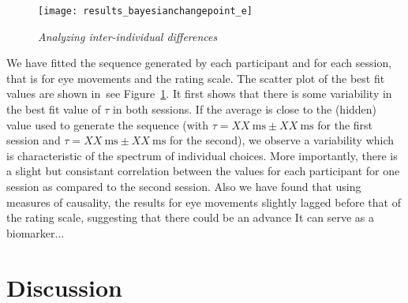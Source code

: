 \documentclass[profile,final,english, draft]{article}%
\newcommand{\ms}{\si{\milli\second}}%
\newcommand{\seeFig}[1]{see Figure~\ref{fig:#1}}
\begin{document}
\begin{figure}%
\begin{center}
    \texttt{[image: results\_bayesianchangepoint\_e]}
\end{center}
\caption{\emph{Analyzing inter-individual differences}
}
\label{fig:results_inter}
\end{figure}
We have fitted the sequence generated by each participant and
for each session, that is for eye movements and the rating scale.
The scatter plot of the best fit values are shown in~\seeFig{results_inter}.
It first shows that there is some variability in the best fit value of $\tau$
in both sessions.
If the average is close to the (hidden) value used to generate the sequence
(with $\tau = XX~\ms \pm XX~\ms$ for the first session and
 $\tau = XX~\ms \pm XX~\ms$ for the second),
 we observe a variability which is characteristic of the spectrum of individual choices.
More importantly, there is a slight but consistant
correlation between the values for each participant for one session
as compared to the second session.
Also we have found that using measures of causality,
the results for eye movements slightly lagged before
that of the rating scale,
suggesting that there could be an advance
It can serve as a biomarker...


\section{Discussion}

\label{sec:outro}
\end{document}
